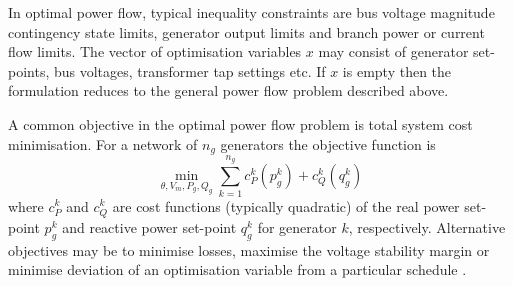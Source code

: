 In optimal power flow, typical inequality
constraints are bus voltage magnitude contingency state limits, generator
output limits and branch power or current flow limits.  The vector of
optimisation variables $x$ may consist of generator set-points, bus voltages,
transformer tap settings etc.  If $x$ is empty then
the formulation reduces to the general power flow problem described above.


A common objective in the optimal power flow problem is total system cost
minimisation. For a network of $n_g$ generators the objective function is
\begin{equation}
\label{eq:objfunc}
\min_{\theta, V_m, P_g, Q_g} \sum_{k=1}^{n_g} c^k_P(p_g^k) + c_Q^k(q_g^k)
\end{equation}
where $c_P^k$ and $c_Q^k$ are cost functions (typically quadratic) of the
real power set-point $p_g^k$ and reactive power set-point $q_g^k$ for generator
$k$, respectively. Alternative objectives may be to minimise losses, maximise
the voltage stability margin or minimise deviation of an optimisation variable
from a particular schedule \cite[\S18]{kallrath:2009}.

